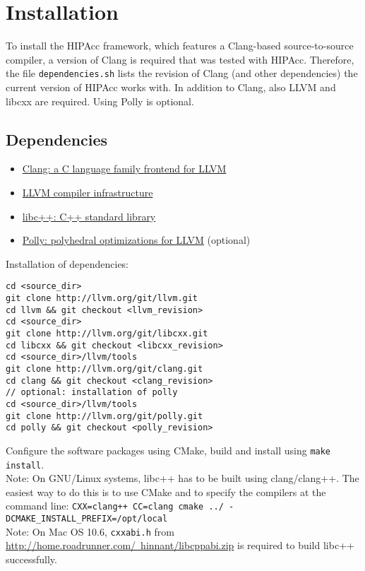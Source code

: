 \section{Installation}
To install the \ac{HIPAcc} framework, which features a Clang-based source-to-source
compiler, a version of Clang is required that was tested with \ac{HIPAcc}.
Therefore, the file {\tt dependencies.sh} lists the revision of Clang (and other
dependencies) the current version of \ac{HIPAcc} works with. In addition to Clang,
also LLVM and libcxx are required. Using Polly is optional.


\subsection{Dependencies}
\begin{itemize}
    \item \href{http://clang.llvm.org}{Clang: a C language family frontend for LLVM}
    \item \href{http://llvm.org}{LLVM compiler infrastructure}
    \item \href{http://libcxx.llvm.org}{libc++: C++ standard library}
    \item \href{http://polly.llvm.org}{Polly: polyhedral optimizations for LLVM} (optional)
\end{itemize}

Installation of dependencies:
\begin{lstlisting}
cd <source_dir>
git clone http://llvm.org/git/llvm.git
cd llvm && git checkout <llvm_revision>
cd <source_dir>
git clone http://llvm.org/git/libcxx.git
cd libcxx && git checkout <libcxx_revision>
cd <source_dir>/llvm/tools
git clone http://llvm.org/git/clang.git
cd clang && git checkout <clang_revision>
// optional: installation of polly
cd <source_dir>/llvm/tools
git clone http://llvm.org/git/polly.git
cd polly && git checkout <polly_revision>
\end{lstlisting}
Configure the software packages using CMake, build and install using {\tt make
install}.\\
Note: On GNU/Linux systems, libc++ has to be built using clang/clang++. The
easiest way to do this is to use CMake and to specify the compilers at the command
line: \verb|CXX=clang++ CC=clang cmake ../ -DCMAKE_INSTALL_PREFIX=/opt/local| \\
Note: On Mac OS 10.6, {\tt cxxabi.h} from
\href{http://home.roadrunner.com/~hinnant/libcppabi.zip}{http://home.roadrunner.com/~hinnant/libcppabi.zip}
is required to build libc++ successfully.


